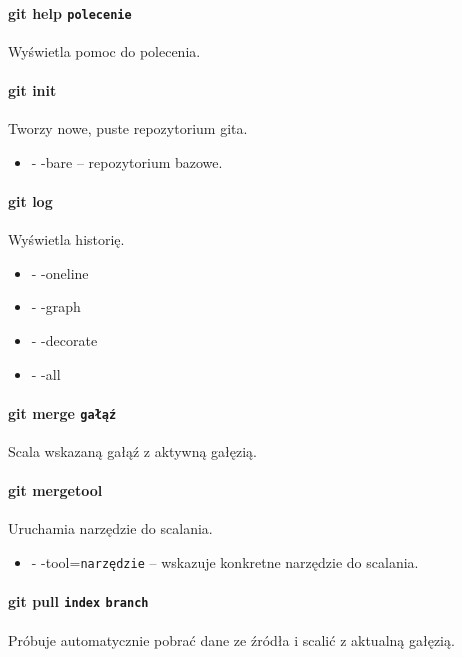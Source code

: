 \paragraph{git help \texttt{polecenie}\\}
Wyświetla pomoc do polecenia.

\paragraph{git init}
Tworzy nowe, puste repozytorium gita.
\begin{itemize}
	\item - -bare -- repozytorium bazowe.
\end{itemize}

\paragraph{git log\\}
Wyświetla historię.
\begin{itemize}
	\item - -oneline
	\item - -graph
	\item - -decorate
	\item - -all
\end{itemize}

\paragraph{git merge \texttt{gałąź}\\}
Scala wskazaną gałąź z aktywną gałęzią.

\paragraph{git mergetool\\}
Uruchamia narzędzie do scalania.
\begin{itemize}
	\item - -tool=\texttt{narzędzie} -- wskazuje konkretne narzędzie do scalania.
\end{itemize}

\paragraph{git pull \texttt{index} \texttt{branch}\\}
Próbuje automatycznie pobrać dane ze źródła i scalić z aktualną gałęzią.

